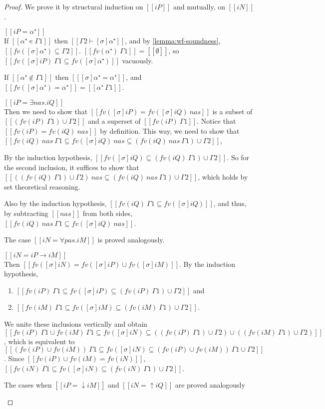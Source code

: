 \lemmaSubstFv*
\begin{proof}
  We prove it by structural induction on 
  $[[iP]]$ and mutually, on $[[iN]]$.
  \begin{caseof}
    \item $[[iP = α⁺]]$\\
      If $[[α⁺ ∊ Γ1]]$ then $[[Γ2 ⊢ [σ]α⁺]]$, and by 
      \cref{lemma:wf-soundness}, $[[fv([σ]α⁺) ⊆ Γ2]]$.
      $[[fv(α⁺) \ Γ1]] = [[∅]]$, so $[[fv([σ]iP) \ Γ1  ⊆ fv([σ]α⁺)]]$
      vacuously.

      If $[[α⁺ ∉ Γ1]]$ then $[[ [σ]α⁺ = α⁺ ]]$, and 
      $[[fv([σ]α⁺) = {α⁺}]] = [[{α⁺} \ Γ1]]$.
      
    \item $[[iP = ∃nas.iQ]]$\\
      Then we need to show that $[[fv([σ]iP) = fv([σ]iQ) \ {nas}]]$
      is a subset of $[[(fv(iP) \ Γ1) ∪ Γ2]]$ and a superset of
      $[[fv(iP) \ Γ1]]$.
      Notice that $[[fv(iP) = fv(iQ) \ {nas}]]$ by definition.
      This way, we need to show that 
      $[[fv(iQ) \ {nas} \ Γ1 ⊆ fv([σ]iQ) \ {nas} ⊆ (fv(iQ) \ {nas} \ Γ1) ∪ Γ2]]$,
      
      By the induction hypothesis, 
      $[[fv([σ]iQ) ⊆ (fv(iQ) \ Γ1) ∪ Γ2]]$.
      So for the second inclusion, it suffices to show that
      $[[((fv(iQ) \ Γ1) ∪ Γ2) \ {nas} ⊆ (fv(iQ) \ {nas} \ Γ1) ∪ Γ2]]$,
      which holds by set theoretical reasoning. 

      Also by the induction hypothesis,
      $[[fv(iQ) \ Γ1 ⊆ fv([σ]iQ)]]$,
      and thus, by subtracting $[[{nas}]]$ from both sides,
      $[[fv(iQ) \ {nas} \ Γ1 ⊆ fv([σ]iQ) \ {nas}]]$.

    \item The case $[[iN = ∀pas.iM]]$ is proved analogously.
    \item $[[iN = iP → iM]]$\\
      Then $[[fv([σ]iN) = fv([σ]iP) ∪ fv([σ]iM)]]$.
      By the induction hypothesis, 
      \begin{enumerate}
        \item $[[ fv(iP) \ Γ1 ⊆ fv([σ]iP) ⊆ (fv(iP) \ Γ1) ∪ Γ2]]$ and
        \item $[[ fv(iM) \ Γ1 ⊆ fv([σ]iM) ⊆ (fv(iM) \ Γ1) ∪ Γ2]]$.
      \end{enumerate}
      We unite these inclusions vertically and obtain
      $[[ fv(iP) \ Γ1 ∪ fv(iM) \ Γ1 ⊆ fv([σ]iN) ⊆ ((fv(iP) \ Γ1) ∪ Γ2) ∪ ((fv(iM) \ Γ1) ∪ Γ2)]]$,
      which is equivalent to 
      $[[ (fv(iP) ∪ fv(iM)) \ Γ1 ⊆ fv([σ]iN) ⊆ (fv(iP) ∪ fv(iM)) \ Γ1 ∪ Γ2]]$.
      Since $[[fv(iP) ∪ fv(iM) = fv(iN)]]$, 
      $[[fv(iN) \ Γ1 ⊆ fv([σ]iN) ⊆ (fv(iN) \ Γ1) ∪ Γ2]]$.
    \item The cases when $[[iP = ↓iM]]$ and $[[iN = ↑iQ]]$ are proved
      analogously
  \end{caseof}
\end{proof}

